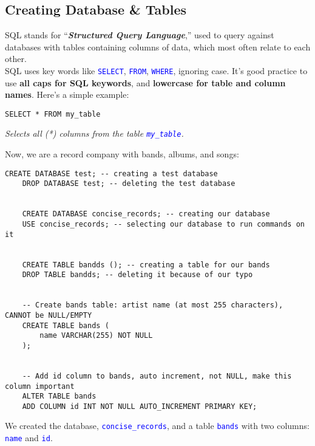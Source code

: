 \subsection{Creating Database \& Tables}





SQL stands for ``\textbf{\textit{Structured Query Language}},'' used to query against databases with tables
containing columns of data, which most often relate to each other.\\

\noindent
SQL uses key words like \textcolor{blue}{\texttt{SELECT}}, \textcolor{blue}{\texttt{FROM}}, \textcolor{blue}{\texttt{WHERE}},
ignoring case. It's good practice to use \textbf{all caps for SQL keywords}, and \textbf{lowercase for table and column names}.
Here's a simple example:

\begin{lstlisting}[style=sql]
    SELECT * FROM my_table
\end{lstlisting}
\begin{centering}
    \textit{Selects all (*) columns from the table \textcolor{blue}{\texttt{my\_table}}.}\\
\end{centering}
\vspace{1em}
\noindent
Now, we are a record company with bands, albums, and songs:

\begin{lstlisting}[style=sql]
    CREATE DATABASE test; -- creating a test database
    DROP DATABASE test; -- deleting the test database


    CREATE DATABASE concise_records; -- creating our database 
    USE concise_records; -- selecting our database to run commands on it


    CREATE TABLE bandds (); -- creating a table for our bands
    DROP TABLE bandds; -- deleting it because of our typo
    

    -- Create bands table: artist name (at most 255 characters), CANNOT be NULL/EMPTY
    CREATE TABLE bands (
        name VARCHAR(255) NOT NULL
    );


    -- Add id column to bands, auto increment, not NULL, make this column important
    ALTER TABLE bands 
    ADD COLUMN id INT NOT NULL AUTO_INCREMENT PRIMARY KEY;
\end{lstlisting}

\vspace{1em}
\noindent
We created the database, \textcolor{blue}{\texttt{concise\_records}}, and a table \textcolor{blue}{\texttt{bands}}
with two columns: \textcolor{blue}{\texttt{name}} and \textcolor{blue}{\texttt{id}}.\\


